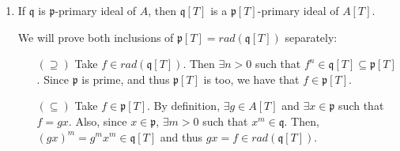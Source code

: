 \begin{problem}
\begin{enumerate}[label=(\theproblem.\arabic*),ref=\theproblem.\arabic*]
\begin{sol}
\begin{proof}
                Now, let $\mathfrak{p}$ be a minimal prime of $I$.
                $\mathfrak{p}[T]$ must contain a minimal prime of $I[T]$, say, $\mathfrak{p}'[T]$
                Then, we take the contraction $I \subseteq \mathfrak{p}' \subseteq \mathfrak{p}$
                and by definition of $\mathfrak{p}$ being a minimal of $I$,
                we conclude that $\mathfrak{p}' = \mathfrak{p}$ and $\mathfrak{p}'[T] = \mathfrak{p}[T]$.
                Thus, $\mathfrak{p}[T]$ is a minimal prime of $I[T]$.

            \end{proof}
        \end{sol}

        \item\label{itm:p_primary_implies_pt_primary} If $\mathfrak{q}$ is $\mathfrak{p}$-primary ideal of $A$, then $\mathfrak{q}[T]$ is a $\mathfrak{p}[T]$-primary ideal of $A[T]$.
        \begin{sol}
            We will prove both inclusions of $\mathfrak{p}[T] = rad(\mathfrak{q}[T])$ separately:
            \begin{itemize}
                \item[$(\supseteq)$]
                Take $f \in rad(\mathfrak{q}[T])$.
                Then $\exists n>0$ such that $f^n \in \mathfrak{q}[T] \subseteq \mathfrak{p}[T]$.
                Since $\mathfrak{p}$ is prime, and thus $\mathfrak{p}[T]$ is too, we have that $f \in \mathfrak{p}[T]$.
                \item[$(\subseteq)$]
                Take $f \in \mathfrak{p}[T]$.
                By definition, $\exists g \in A[T]$ and $\exists x \in \mathfrak{p}$ such that $f = g x$.
                Also, since $x \in \mathfrak{p}$, $\exists m>0$ such that $x^m \in \mathfrak{q}$.
                Then, $( g x )^m = g^m x^m \in \mathfrak{q}[T]$ and thus $g x = f \in rad(\mathfrak{q}[T])$.
            \end{itemize}
        \end{sol}


\end{enumerate}
\end{problem}
